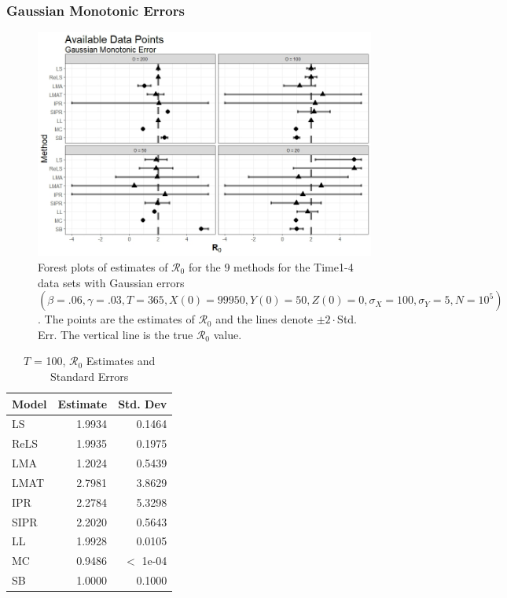 \documentclass[12pt]{article}
\newcommand{\xxsir}{\ensuremath{9} } %
\newcommand{\rr}{\ensuremath{\mathcal{R}_0}}
\begin{document}
\subsubsection{Gaussian Monotonic Errors}
\begin{figure}[H]
	\centering
	\includegraphics[scale=0.5]{images/time_nm.jpeg}
	\caption{Forest plots of estimates of $\rr$ for the \xxsir methods for the Time1-4 data sets with Gaussian errors $(\beta=.06, \gamma=.03, T=365, X(0)=99950, Y(0)=50, Z(0)=0, \sigma_X=100, \sigma_Y=5, N=10^5)$.  The points are the estimates of $\rr$ and the lines denote $\pm 2\cdot $Std. Err.  The vertical line is the true $\rr$ value.}
\end{figure}

\begin{table}[H]
	
	
	\centering
	\begin{tabular}[t]{l|r|r}
		\hline
		Model & Estimate & Std. Dev\\
		\hline
		LS & 1.9934 & 0.1464\\
		\hline
		ReLS & 1.9935 & 0.1975\\
		\hline
		LMA & 1.2024 & 0.5439\\
		\hline
		LMAT & 2.7981 & 3.8629\\
		\hline
		IPR & 2.2784 & 5.3298\\
		\hline
		SIPR & 2.2020 & 0.5643\\
		\hline
		LL & 1.9928 & 0.0105\\
		\hline
		MC & 0.9486 & $<$ 1e-04\\
		\hline
		SB & 1.0000 & 0.1000\\
		\hline
	\end{tabular}
	\caption{ $T$ = 100, $\rr$ Estimates and Standard Errors}
\end{table}
\end{document}
